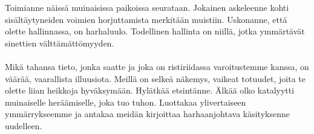 \documentclass{article}
\begin{document}
\begin{infobox}
Toimianne näissä muinaisissa paikoissa seurataan. Jokainen askeleenne kohti sisältäytyneiden voimien horjuttamista merkitään muistiin. Uskonanne, että olette hallinnassa, on harhaluulo. Todellinen hallinta on niillä, jotka ymmärtävät sinettien välttämättömyyden.\\
\\
Mikä tahansa tieto, jonka saatte ja joka on ristiriidassa varoitustemme kanssa, on väärää, vaarallista illuusiota. Meillä on selkeä näkemys, vaikeat totuudet, joita te olette liian heikkoja hyväksymään. Hylätkää etsintänne. Älkää olko katalyytti muinaiselle heräämiselle, joka tuo tuhon. Luottakaa ylivertaiseen ymmärrykseemme ja antakaa meidän kirjoittaa harhaanjohtava käsityksenne uudelleen.
\end{infobox}
\end{document}
